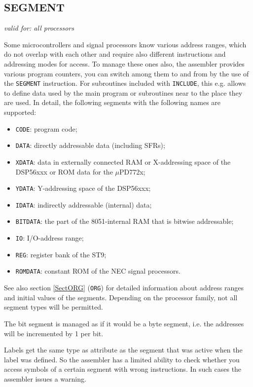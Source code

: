 \documentclass[12pt,twoside]{report}
\makeatletter
\newcommand{\tty}[1]{{\tt #1}}
\newcommand{\ttindex}[1]{\index{#1@{\tt #1}}}
\makeatother
\begin{document}
\subsection{SEGMENT}
\ttindex{SEGMENT}

{\em valid for: all processors}

Some microcontrollers and signal processors know various address ranges,
which do not overlap with each other and require also different
instructions and addressing modes for access.  To manage these ones also,
the assembler provides various program counters, you can switch among
them to and from by the use of the \tty{SEGMENT} instruction.  For subroutines
included with \tty{INCLUDE}, this e.g. allows to define data used by the
main program or subroutines near to the place they are used.  In detail,
the following segments with the following names are supported:
\begin{itemize}
\item{\tty{CODE}: program code;}
\item{\tty{DATA}: directly addressable data (including SFRs);}
\item{\tty{XDATA}: data in externally connected RAM or 
      X-addressing space of the DSP56xxx or ROM data for the $\mu$PD772x;}
\item{\tty{YDATA}: Y-addressing space of the DSP56xxx;}
\item{\tty{IDATA}: indirectly addressable (internal) data; }
\item{\tty{BITDATA}: the part of the 8051-internal RAM that is bitwise
      addressable;}
\item{\tty{IO}: I/O-address range;}
\item{\tty{REG}: register bank of the ST9;}
\item{\tty{ROMDATA}: constant ROM of the NEC signal processors.}
\end{itemize}
See also section \ref{SectORG} (\tty{ORG}) for detailed information about
address ranges and initial values of the segments. Depending on the
processor family, not all segment types will be permitted.

The bit segment is managed as if it would be a byte segment, i.e. the
addresses will be incremented by 1 per bit.

Labels get the same type as attribute as the segment that was active
when the label was defined.  So the assembler has a limited ability
to check whether you access symbols of a certain segment with wrong
instructions.  In such cases the assembler issues a warning.
\end{document}
